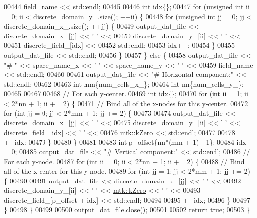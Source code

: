 \begin{DoxyCode}
00444       field\_name << std::endl;
00445 
00446     \textcolor{keywordtype}{int} idx\{\};
00447     \textcolor{keywordflow}{for} (\textcolor{keywordtype}{unsigned} \textcolor{keywordtype}{int} ii = 0; ii < discrete\_domain\_y\_.size(); ++ii) \{
00448       \textcolor{keywordflow}{for} (\textcolor{keywordtype}{unsigned} \textcolor{keywordtype}{int} jj = 0; jj < discrete\_domain\_x\_.size(); ++jj) \{
00449         output\_dat\_file << discrete\_domain\_x\_[jj] << \textcolor{charliteral}{' '} <<
00450                            discrete\_domain\_y\_[ii] << \textcolor{charliteral}{' '} <<
00451                            discrete\_field\_[idx] <<
00452                           std::endl;
00453         idx++;
00454       \}
00455       output\_dat\_file << std::endl;
00456     \}
00457   \} \textcolor{keywordflow}{else} \{
00458     output\_dat\_file << \textcolor{stringliteral}{"# "} << space\_name\_x <<  \textcolor{charliteral}{' '} << space\_name\_y << \textcolor{charliteral}{' '} <<
00459       field\_name << std::endl;
00460 
00461     output\_dat\_file << \textcolor{stringliteral}{"# Horizontal component:"} << std::endl;
00462 
00463     \textcolor{keywordtype}{int} mm\{num\_cells\_x\_\};
00464     \textcolor{keywordtype}{int} nn\{num\_cells\_y\_\};
00465 
00467 
00468     \textcolor{comment}{// For each y-center.}
00469     \textcolor{keywordtype}{int} idx\{\};
00470     \textcolor{keywordflow}{for} (\textcolor{keywordtype}{int} ii = 1; ii < 2*nn + 1; ii += 2) \{
00471       \textcolor{comment}{// Bind all of the x-nodes for this y-center.}
00472       \textcolor{keywordflow}{for} (\textcolor{keywordtype}{int} jj = 0; jj < 2*mm + 1; jj += 2) \{
00473 
00474         output\_dat\_file << discrete\_domain\_x\_[jj] << \textcolor{charliteral}{' '} <<
00475           discrete\_domain\_y\_[ii] << \textcolor{charliteral}{' '} << discrete\_field\_[idx] << \textcolor{charliteral}{' '} <<
00476           \hyperlink{group__c01-roots_ga59a451a5fae30d59649bcda274fea271}{mtk::kZero} << std::endl;
00477 
00478         ++idx;
00479       \}
00480     \}
00481 
00483     \textcolor{keywordtype}{int} p\_offset\{nn*(mm + 1) - 1\};
00484     idx = 0;
00485     output\_dat\_file << \textcolor{stringliteral}{"# Vertical component:"} << std::endl;
00486     \textcolor{comment}{// For each y-node.}
00487     \textcolor{keywordflow}{for} (\textcolor{keywordtype}{int} ii = 0; ii < 2*nn + 1; ii += 2) \{
00488       \textcolor{comment}{// Bind all of the x-center for this y-node.}
00489       \textcolor{keywordflow}{for} (\textcolor{keywordtype}{int} jj = 1; jj < 2*mm + 1; jj += 2) \{
00490 
00491         output\_dat\_file << discrete\_domain\_x\_[jj] << \textcolor{charliteral}{' '} <<
00492           discrete\_domain\_y\_[ii] << \textcolor{charliteral}{' '} << \hyperlink{group__c01-roots_ga59a451a5fae30d59649bcda274fea271}{mtk::kZero} << \textcolor{charliteral}{' '} <<
00493           discrete\_field\_[p\_offset + idx] << std::endl;
00494 
00495         ++idx;
00496       \}
00497     \}
00498   \}
00499 
00500   output\_dat\_file.close();
00501 
00502   \textcolor{keywordflow}{return} \textcolor{keyword}{true};
00503 \}
\end{DoxyCode}
